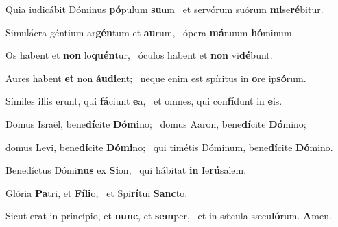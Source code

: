 \item Quia iudicábit Dóminus \textbf{pó}pulum \textbf{su}um~\psstar{} et servórum suórum \textbf{mi}se\textbf{ré}bitur.

\item Simulácra géntium ar\textbf{gén}tum et \textbf{au}rum,~\psstar{} ópera \textbf{má}nuum \textbf{hó}minum.

\item Os habent et \textbf{non} lo\textbf{quén}tur,~\psstar{} óculos habent et \textbf{non} vi\textbf{dé}bunt.

\item Aures habent \textbf{et} non \textbf{áu}\textbf{di}ent;~\psstar{} neque enim est spíritus in \textbf{o}re ip\textbf{só}rum.

\item Símiles illis erunt, qui \textbf{fá}ciunt \textbf{e}a,~\psstar{} et omnes, qui con\textbf{fí}dunt in \textbf{e}is.

\item Domus Israël, bene\textbf{dí}cite \textbf{Dó}\textbf{mi}no;~\psstar{} domus Aaron, bene\textbf{dí}cite \textbf{Dó}mino;

\item domus Levi, bene\textbf{dí}cite \textbf{Dó}\textbf{mi}no;~\psstar{} qui timétis Dóminum, bene\textbf{dí}cite \textbf{Dó}mino.

\item Benedíctus Dómi\textbf{nus} ex \textbf{Si}on,~\psstar{} qui hábitat \textbf{in} Ie\textbf{rú}salem.

\item Glória \textbf{Pa}tri, et \textbf{Fí}\textbf{li}o,~\psstar{} et Spi\textbf{rí}tui \textbf{Sanc}to.

\item Sicut erat in princípio, et \textbf{nunc}, et \textbf{sem}per,~\psstar{} et in sǽcula sæcu\textbf{ló}rum. \textbf{A}men.